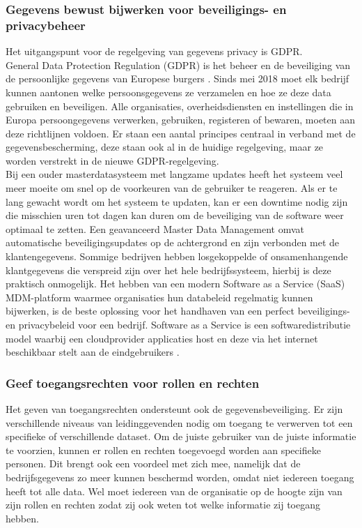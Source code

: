 \subsubsection{Gegevens bewust bijwerken voor beveiligings- en privacybeheer}
Het uitgangspunt voor de regelgeving van gegevens privacy is GDPR.
\\General Data Protection Regulation (GDPR) is het beheer en de beveiliging van de persoonlijke gegevens van Europese burgers \autocite{Vlaanderen}. Sinds mei 2018 moet elk bedrijf kunnen aantonen welke persoonsgegevens ze verzamelen en hoe ze deze data gebruiken en beveiligen. Alle organisaties, overheidsdiensten en instellingen die in Europa persoongegevens verwerken, gebruiken, registeren of bewaren, moeten aan deze richtlijnen voldoen. Er staan een aantal principes centraal in verband met de gegevensbescherming, deze staan ook al in de huidige regelgeving, maar ze worden verstrekt in de nieuwe GDPR-regelgeving.
\\Bij een ouder masterdatasysteem met langzame updates heeft het systeem veel meer moeite om snel op de voorkeuren van de gebruiker te reageren. Als er te lang gewacht wordt om het systeem te updaten, kan er een downtime nodig zijn die misschien uren tot dagen kan duren om de beveiliging van de software weer optimaal te zetten. Een geavanceerd Master Data Management omvat automatische beveiligingsupdates op de achtergrond en zijn verbonden met de klantengegevens. Sommige bedrijven hebben losgekoppelde of onsamenhangende klantgegevens die verspreid zijn over het hele bedrijfssysteem, hierbij is deze praktisch onmogelijk. Het hebben van een modern Software as a Service (SaaS) MDM-platform waarmee organisaties hun databeleid regelmatig kunnen bijwerken, is de beste oplossing voor het handhaven van een perfect beveiligings- en privacybeleid voor een bedrijf. Software as a Service is een softwaredistributie model waarbij een cloudprovider applicaties host en deze via het internet beschikbaar stelt aan de eindgebruikers \autocite{Chai2022}.

\subsubsection{Geef toegangsrechten voor rollen en rechten}
Het geven van toegangsrechten ondersteunt ook de gegevensbeveiliging. Er zijn verschillende niveaus van leidinggevenden nodig om toegang te verwerven tot een specifieke of verschillende dataset. Om de juiste gebruiker van de juiste informatie te voorzien, kunnen er rollen en rechten toegevoegd worden aan specifieke personen. Dit brengt ook een voordeel met zich mee, namelijk dat de bedrijfsgegevens zo meer kunnen beschermd worden, omdat niet iedereen toegang heeft tot alle data. Wel moet iedereen van de organisatie op de hoogte zijn van zijn rollen en rechten zodat zij ook weten tot welke informatie zij toegang hebben. 

